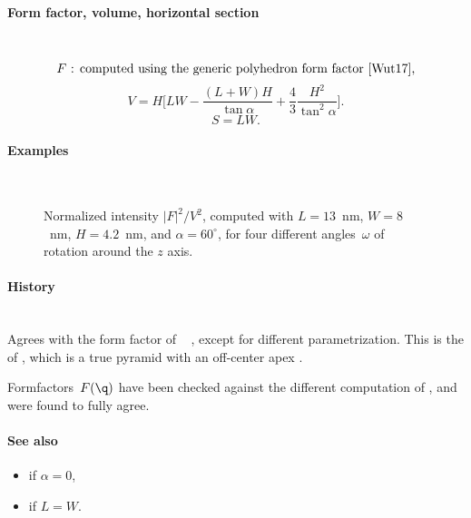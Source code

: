 \paragraph{Form factor, volume, horizontal section}\strut\\
\begin{equation*}
  F \text{~: computed using the generic polyhedron form factor~\cite{Wut17},}
\end{equation*}
\begin{equation*}
  V= H \Big[LW - \dfrac{(L + W)H}{\tan\alpha} + \dfrac{4}{3} \dfrac{H^2}{\tan^2\alpha}\Big].
\end{equation*}
\begin{equation*}
  S=LW.
\end{equation*}

\paragraph{Examples}\strut\\
\begin{figure}[H]
\begin{center}
\end{center}
\caption{Normalized intensity $|F|^2/V^2$,
computed with $L=13$~nm, $W=8$~nm, $H=4.2$~nm, and $\alpha=60^\circ$,
for four different angles~$\omega$ of rotation around the $z$ axis.}
\label{fig:FFAnisoPyramidEx}
\end{figure}

\paragraph{History}\strut\\
Agrees with the  form factor of \IsGISAXS\
\cite[Eq.~2.40]{Laz06} \cite[Eq.~217]{ReLL09},
except for different parametrization.
This is  the  of \FitGISAXS,
which is a true pyramid with an off-center apex \cite{Bab13}.

Formfactors~$F(\q)$ have been checked against the different computation of \IsGISAXS,
and were found to fully agree.

\paragraph{See also}
\begin{itemize}
\item {} if $\alpha=0$,
\item {} if $L=W$.
\end{itemize}

